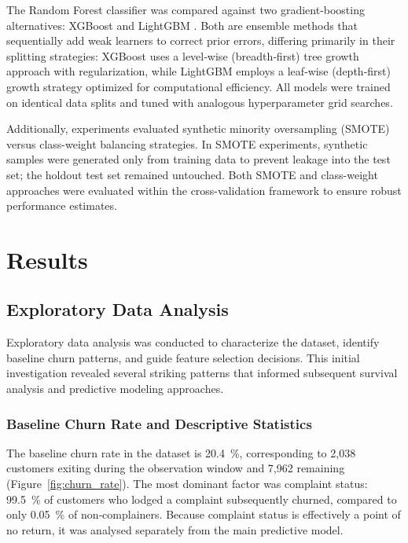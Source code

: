 \documentclass[12pt]{article}
\begin{document}
The Random Forest classifier was compared against two gradient‑boosting alternatives: XGBoost \citep{Chen_2016} and LightGBM \citep{ke2017lightgbm}. Both are ensemble methods that sequentially add weak learners to correct prior errors, differing primarily in their splitting strategies: XGBoost uses a level‑wise (breadth‑first) tree growth approach with regularization, while LightGBM employs a leaf‑wise (depth‑first) growth strategy optimized for computational efficiency. All models were trained on identical data splits and tuned with analogous hyperparameter grid searches.

Additionally, experiments evaluated synthetic minority oversampling (SMOTE) versus class-weight balancing strategies. In SMOTE experiments, synthetic samples were generated only from training data to prevent leakage into the test set; the holdout test set remained untouched. Both SMOTE and class-weight approaches were evaluated within the cross-validation framework to ensure robust performance estimates.

\section{Results}
\subsection{Exploratory Data Analysis}
Exploratory data analysis was conducted to characterize the dataset, identify baseline churn patterns, and guide feature selection decisions. This initial investigation revealed several striking patterns that informed subsequent survival analysis and predictive modeling approaches.

\subsubsection{Baseline Churn Rate and Descriptive Statistics}
The baseline churn rate in the dataset is 20.4~\%, corresponding to 2,038 customers exiting during the observation window and 7,962 remaining (Figure~\ref{fig:churn_rate}). The most dominant factor was complaint status: 99.5~\% of customers who lodged a complaint subsequently churned, compared to only 0.05~\% of non‑complainers. Because complaint status is effectively a point of no return, it was analysed separately from the main predictive model.
\end{document}
